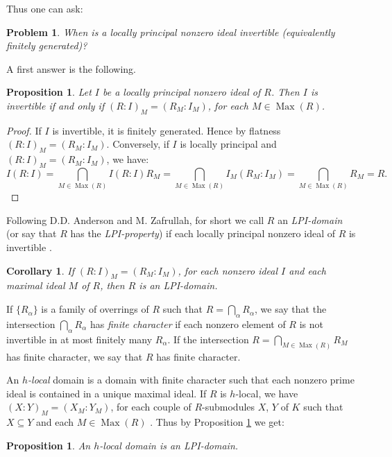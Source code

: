 \documentclass[12pt]{amsart}
\newtheorem{proposition}[theorem]{Proposition}
\newtheorem{corollary}[theorem]{Corollary}
\newtheorem{Qu}{Problem}
\theoremstyle{definition}
\begin{document}
Thus one can ask:

\begin{Qu} \label{Q1} When is a locally principal nonzero ideal invertible (equivalently finitely generated)? \end{Qu}

A first answer is the following.

\begin{proposition} \cite[Theorem 3]{AZ}  \label{prop1} Let $I$ be a locally principal nonzero ideal of $R$. Then 
$I$ is invertible if and only if $(R:I)_M=(R_M:I_M)$, for each  $M\in \operatorname{Max}(R)$.
\end{proposition}
\begin{proof} If $I$ is invertible, it is finitely generated. Hence by flatness $(R:I)_M=(R_M:I_M)$. 
Conversely, if $I$ is locally principal and  $(R:I)_M=(R_M:I_M)$, we have:
$$I(R:I)=\bigcap_{M\in \operatorname{Max}(R)}I(R:I)R_M= \bigcap_{M\in \operatorname{Max}(R)}I_M(R_M:I_M)=\bigcap_{M\in \operatorname{Max}(R)}R_M=R.$$ \end{proof}

Following D.D. Anderson and M. Zafrullah, for short we call $R$ an \emph{LPI-domain} (or say that $R$ has the \emph{LPI-property}) if each locally principal nonzero ideal of $R$ is invertible  \cite{AZ}.

\begin{corollary} If $(R:I)_M=(R_M:I_M)$, for each nonzero ideal $I$ and each maximal ideal $M$ of $R$, then $R$ is an LPI-domain.
\end{corollary}

 If $\{R_{\alpha}\}$ is a family of overrings of $R$ such that $R= \bigcap_{\alpha} R_{\alpha}$, we say that the intersection $\bigcap_{\alpha} R_{\alpha}$ has \emph{finite character} if each nonzero element  of $R$ is not invertible  in  at most finitely many $R_{\alpha}$. If the intersection $R=\bigcap_{M\in \operatorname{Max}(R)}R_M$ has finite character, we say that $R$ has finite character.

An \emph{$h$-local} domain is a domain with finite character such that each nonzero prime ideal is contained in a unique maximal ideal. If $R$ is $h$-local,  we have $(X:Y)_M=(X_M:Y_M)$, for each couple of $R$-submodules $X$, $Y$ of $K$ such that $X{\subseteq} Y$ and each  $M\in \operatorname{Max}(R)$ \cite[Lemma 2.3]{BS2}. Thus by Proposition \ref{prop1} we get:

\begin{proposition} \cite[Lemma 3.9]{O3} An $h$-local domain is an LPI-domain.
\end{proposition}
\end{document}
